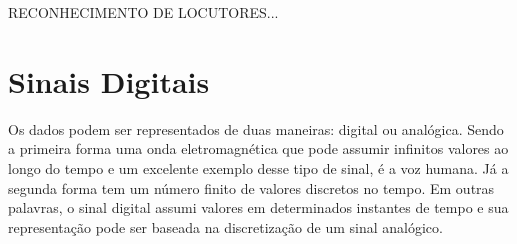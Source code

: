 \documentclass[a4paper,12pt,twoside,openright]{report}
\begin{document}
\par RECONHECIMENTO DE LOCUTORES...
\section{Sinais Digitais}
\label{sinais_digitais}
\par Os dados podem ser representados de duas maneiras: digital ou anal\'{o}gica. Sendo a primeira forma uma onda eletromagn\'{e}tica que pode assumir infinitos valores ao longo do tempo e um excelente exemplo desse tipo de sinal, \'{e} a voz humana. J\'{a} a segunda forma tem um n\'{u}mero finito de valores discretos no tempo. Em outras palavras, o sinal digital assumi valores em determinados instantes de tempo e sua representa{\c c}\~{a}o pode ser baseada na discretiza{\c c}\~{a}o de um sinal anal\'{o}gico.
\end{document}
